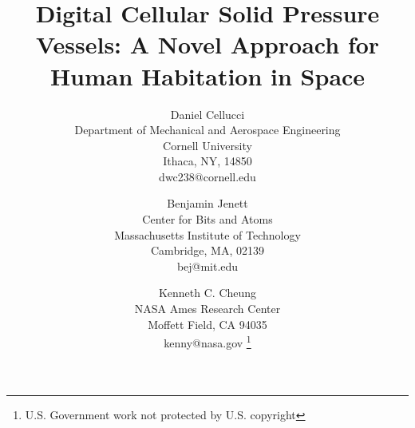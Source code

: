 \documentclass[twocolumn,letterpaper]{IEEEAerospaceCLS}  %
\begin{document}
\title{Digital Cellular Solid Pressure Vessels: A Novel Approach for Human Habitation
in Space}

\author{%
Daniel Cellucci\\
Department of Mechanical and Aerospace Engineering\\
Cornell University\\
Ithaca, NY, 14850\\
dwc238@cornell.edu
\and
Benjamin Jenett\\
Center for Bits and Atoms\\
Massachusetts Institute of Technology\\
Cambridge, MA, 02139\\
bej@mit.edu
\and
Kenneth C. Cheung\\
NASA Ames Research Center\\
Moffett Field, CA 94035\\
kenny@nasa.gov
\thanks{{U.S. Government work not protected by U.S. copyright}}         %
}
\maketitle

\thispagestyle{plain}
\pagestyle{plain}
\end{document}
